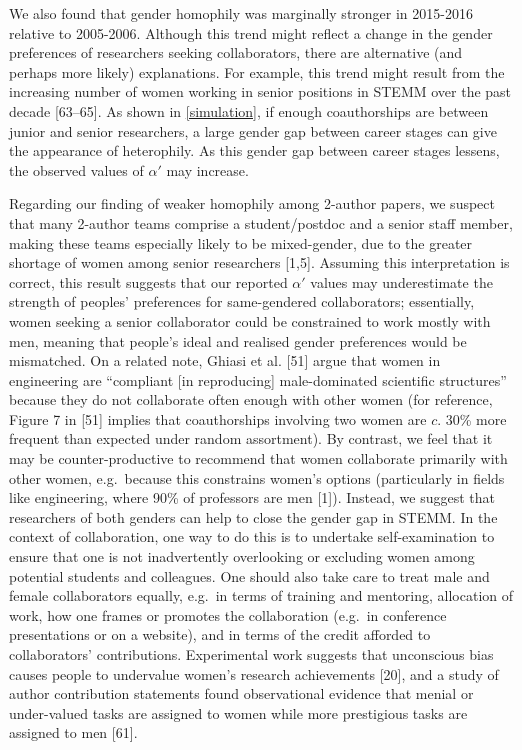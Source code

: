\documentclass[12pt,]{article}
\begin{document}
We also found that gender homophily was marginally stronger in 2015-2016
relative to 2005-2006. Although this trend might reflect a change in the
gender preferences of researchers seeking collaborators, there are
alternative (and perhaps more likely) explanations. For example, this
trend might result from the increasing number of women working in senior
positions in STEMM over the past decade {[}63--65{]}. As shown in
\autoref{simulation}, if enough coauthorships are between junior and
senior researchers, a large gender gap between career stages can give
the appearance of heterophily. As this gender gap between career stages
lessens, the observed values of \(\alpha'\) may increase.

Regarding our finding of weaker homophily among 2-author papers, we
suspect that many 2-author teams comprise a student/postdoc and a senior
staff member, making these teams especially likely to be mixed-gender,
due to the greater shortage of women among senior researchers {[}1,5{]}.
Assuming this interpretation is correct, this result suggests that our
reported \(\alpha'\) values may underestimate the strength of peoples'
preferences for same-gendered collaborators; essentially, women seeking
a senior collaborator could be constrained to work mostly with men,
meaning that people's ideal and realised gender preferences would be
mismatched. On a related note, Ghiasi et al. {[}51{]} argue that women
in engineering are ``compliant {[}in reproducing{]} male-dominated
scientific structures'' because they do not collaborate often enough
with other women (for reference, Figure 7 in {[}51{]} implies that
coauthorships involving two women are \(c\). 30\% more frequent than
expected under random assortment). By contrast, we feel that it may be
counter-productive to recommend that women collaborate primarily with
other women, e.g.~because this constrains women's options (particularly
in fields like engineering, where 90\% of professors are men {[}1{]}).
Instead, we suggest that researchers of both genders can help to close
the gender gap in STEMM. In the context of collaboration, one way to do
this is to undertake self-examination to ensure that one is not
inadvertently overlooking or excluding women among potential students
and colleagues. One should also take care to treat male and female
collaborators equally, e.g.~in terms of training and mentoring,
allocation of work, how one frames or promotes the collaboration
(e.g.~in conference presentations or on a website), and in terms of the
credit afforded to collaborators' contributions. Experimental work
suggests that unconscious bias causes people to undervalue women's
research achievements {[}20{]}, and a study of author contribution
statements found observational evidence that menial or under-valued
tasks are assigned to women while more prestigious tasks are assigned to
men {[}61{]}.
\end{document}
